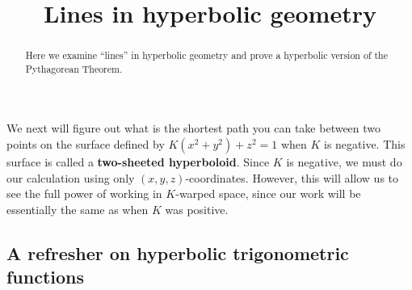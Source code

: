 \documentclass[handout,newpage,hints,,12pt,noauthor,nooutcomes]{ximera}
\title{Lines in hyperbolic geometry}
\begin{document}
\begin{abstract}
Here we examine ``lines'' in hyperbolic geometry and prove a
hyperbolic version of the Pythagorean Theorem.
\end{abstract}
\maketitle



We next will figure out what is the shortest path you can take between
two points on the surface defined by $K(x^2+y^2)+z^2=1$ when $K$ is
negative. This surface is called a \textbf{two-sheeted
  hyperboloid}. Since $K$ is negative, we must do our calculation
using only $(x,y,z)$-coordinates. However, this will allow us to see
the full power of working in $K$-warped space, since our work will be
essentially the same as when $K$ was positive.




\subsection{A refresher on hyperbolic trigonometric functions}
\end{document}
